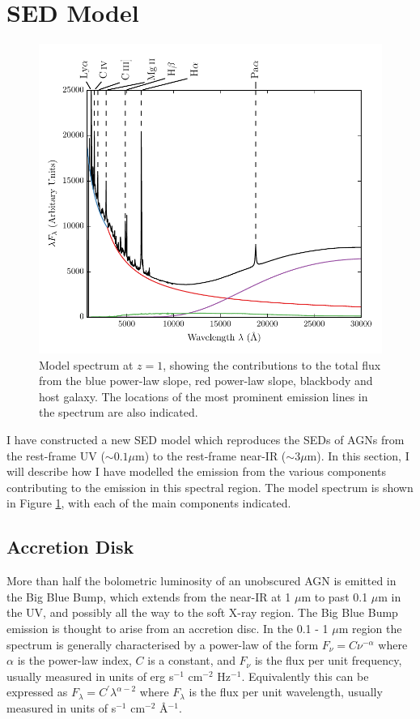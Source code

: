 \section{SED Model}

\begin{figure}[h]
  \centering
  \includegraphics[width=\textwidth]{figures/chapter06/sed_model.pdf}
  \caption{Model spectrum at $z=1$, showing the contributions to the total flux from the blue power-law slope, red power-law slope, blackbody and host galaxy. The locations of the most prominent emission lines in the spectrum are also indicated. }
  \label{fig:modelsed}
\end{figure}

I have constructed a new SED model which reproduces the SEDs of AGNs from the rest-frame UV ($\sim 0.1 \mu$m) to the rest-frame near-IR ($\sim 3 \mu$m). 
In this section, I will describe how I have modelled the emission from the various components contributing to the emission in this spectral region. 
The model spectrum is shown in Figure \ref{fig:modelsed}, with each of the main components indicated. 

\subsection{Accretion Disk}

More than half the bolometric luminosity of an unobscured AGN is emitted in the Big Blue Bump, which extends from the near-IR at 1 $\mu$m to past 0.1 $\mu$m in the UV, and possibly all the way to the soft X-ray region.
The Big Blue Bump emission is thought to arise from an accretion disc. 
In the 0.1 - 1 $\mu$m region the spectrum is generally characterised by a power-law of the form $F_\nu = C\nu^{-\alpha}$ where $\alpha$ is the power-law index, $C$ is a constant, and $F_\nu$ is the flux per unit frequency, usually measured in units of erg s$^{-1}$ cm$^{-2}$ Hz$^{-1}$. 
Equivalently this can be expressed as $F_\lambda = C^\prime\lambda^{\alpha - 2}$ where $F_\lambda$ is the flux per unit wavelength, usually measured in units of s$^{-1}$ cm$^{-2}$ \AA$^{-1}$. 

